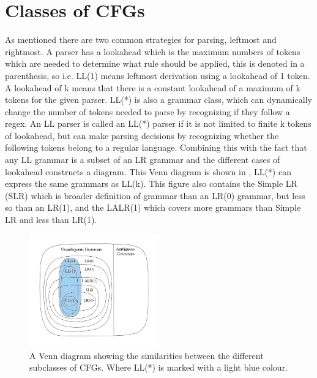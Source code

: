 \section{Classes of CFGs}
As mentioned there are two common strategies for parsing, leftmost and rightmost. 
A parser has a lookahead which is the maximum numbers of tokens which are needed to determine what rule should be applied, this is denoted in a parenthesis, so i.e. LL(1) means leftmost derivation using a lookahead of 1 token. 
A lookahead of k means that there is a constant lookahead of a maximum of k tokens for the given parser. 
LL(*) is also a grammar class, which can dynamically change the number of tokens needed to parse by recognizing if they follow a \acrshort{regex}.
An LL parser is called an LL(*) parser if it is not limited to finite k tokens of lookahead, but can make parsing decisions by recognizing whether the following tokens belong to a regular language.
Combining this with the fact that any LL grammar is a subset of an LR grammar and the different cases of lookahead constructs a diagram. 
This Venn diagram is shown in , LL(*) can express the same grammars as LL(k).
This figure also contains the Simple LR (SLR) which is broader definition of grammar than an LR(0) grammar, but less so than an LR(1), and the LALR(1) which covers more grammars than Simple LR and less than LR(1). 
\begin{figure}[!ht]
\centering
 \includegraphics[width=0.5\textwidth]{figures/classesofgrammars.png} %
\caption{A Venn diagram showing the similarities between the different subclasses of CFGs. Where LL(*) is marked with a light blue colour. \citep{Lecture5}}
\label{fig:hierarchyofgrammars}
\vspace{-15pt}
\end{figure}
